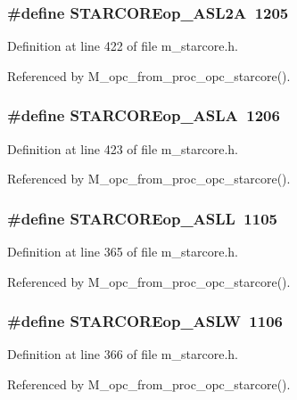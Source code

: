 \subsubsection{\setlength{\rightskip}{0pt plus 5cm}\#define STARCOREop\_\-ASL2A~1205}\label{m__starcore_8h_27b4b07eeb737a37750b6827e072287f}




Definition at line 422 of file m\_\-starcore.h.

Referenced by M\_\-opc\_\-from\_\-proc\_\-opc\_\-starcore().
\subsubsection{\setlength{\rightskip}{0pt plus 5cm}\#define STARCOREop\_\-ASLA~1206}\label{m__starcore_8h_d70f2debba65f63efc9ac591042d998f}




Definition at line 423 of file m\_\-starcore.h.

Referenced by M\_\-opc\_\-from\_\-proc\_\-opc\_\-starcore().
\subsubsection{\setlength{\rightskip}{0pt plus 5cm}\#define STARCOREop\_\-ASLL~1105}\label{m__starcore_8h_992897b73f1a372bb63edb5fca163419}




Definition at line 365 of file m\_\-starcore.h.

Referenced by M\_\-opc\_\-from\_\-proc\_\-opc\_\-starcore().
\subsubsection{\setlength{\rightskip}{0pt plus 5cm}\#define STARCOREop\_\-ASLW~1106}\label{m__starcore_8h_2147ae64a35be91ecd384f7b0a80d994}




Definition at line 366 of file m\_\-starcore.h.

Referenced by M\_\-opc\_\-from\_\-proc\_\-opc\_\-starcore().
